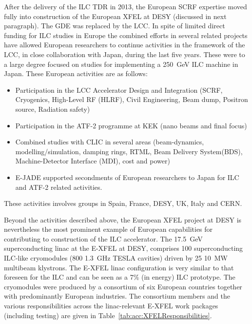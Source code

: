 \documentclass[%
 reprint,
 amsmath,amssymb,
 aps,
]{revtex4-1}
\begin{document}
After the delivery of the ILC TDR in 2013, the European SCRF expertise moved fully into construction of the European XFEL at DESY (discussed in next paragraph). 
The GDE was replaced by the LCC. In spite of limited direct funding for ILC studies in Europe the combined efforts in 
several related projects have allowed European researchers to continue activities in the framework of the LCC, in close collaboration with Japan, during
the last five years. These were to a large degree focused on studies for implementing a 250~GeV ILC machine in Japan. 
These European activities are as follows:
\begin{itemize}
\item Participation in the LCC Accelerator Design and Integration (SCRF, Cryogenics, High-Level RF (HLRF), Civil Engineering, Beam dump, Positron source, Radiation safety)
\item Participation in the ATF-2 programme at KEK (nano beams and final focus)
\item Combined studies with CLIC in several areas (beam-dynamics, modelling/simulation, damping rings, RTML, Beam Delivery System(BDS), Machine-Detector Interface (MDI), cost and power)
\item E-JADE supported secondments of European researchers to Japan for ILC and ATF-2 related activities.
\end{itemize}
These activities involves groups in Spain, France, DESY, UK, Italy and CERN. 



Beyond the activities described above, the European XFEL project at DESY is nevertheless the most prominent example of European capabilities for contributing to construction of the ILC accelerator.
The 17.5~GeV superconducting linac at the E-XFEL at DESY, comprises 100 superconducting ILC-like cryomodules (800 1.3~GHz TESLA cavities) driven by 25 10~MW multibeam klystrons. The E-XFEL linac configuration is very similar to that foreseen for the ILC and can be seen as a 7\% (in energy) ILC prototype. The cryomodules were produced by a consortium of six European countries together with predominantly European industries. The consortium members and the various responsibilities across the linac-relevant E-XFEL work packages (including testing) are given in Table~\ref{tab:acc:XFELResponsibilities}.
\end{document}
